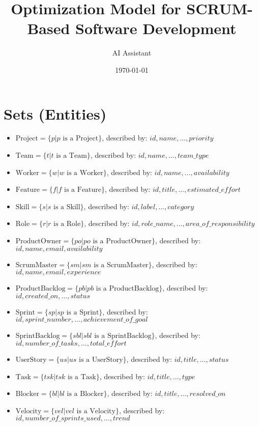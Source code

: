 \documentclass[11pt]{article}
\title{Optimization Model for SCRUM-Based Software Development}
\author{AI Assistant}
\date{\today}
\begin{document}
\maketitle
\tableofcontents
\newpage

\section{Sets (Entities)}
\begin{itemize}
    \item $\text{Project} = \{p | p \text{ is a Project}\}$, described by: $id, name, \dots, priority$
    \item $\text{Team} = \{t | t \text{ is a Team}\}$, described by: $id, name, \dots, team\_type$
    \item $\text{Worker} = \{w | w \text{ is a Worker}\}$, described by: $id, name, \dots, availability$
    \item $\text{Feature} = \{f | f \text{ is a Feature}\}$, described by: $id, title, \dots, estimated\_effort$
    \item $\text{Skill} = \{s | s \text{ is a Skill}\}$, described by: $id, label, \dots, category$
    \item $\text{Role} = \{r | r \text{ is a Role}\}$, described by: $id, role\_name, \dots, area\_of\_responsibility$
    \item $\text{ProductOwner} = \{po | po \text{ is a ProductOwner}\}$, described by: $id, name, email, availability$
    \item $\text{ScrumMaster} = \{sm | sm \text{ is a ScrumMaster}\}$, described by: $id, name, email, experience$
    \item $\text{ProductBacklog} = \{pb | pb \text{ is a ProductBacklog}\}$, described by: $id, created\_on, \dots, status$
    \item $\text{Sprint} = \{sp | sp \text{ is a Sprint}\}$, described by: $id, sprint\_number, \dots, achievement\_of\_goal$
    \item $\text{SprintBacklog} = \{sbl | sbl \text{ is a SprintBacklog}\}$, described by: $id, number\_of\_tasks, \dots, total\_effort$
    \item $\text{UserStory} = \{us | us \text{ is a UserStory}\}$, described by: $id, title, \dots, status$
    \item $\text{Task} = \{tsk | tsk \text{ is a Task}\}$, described by: $id, title, \dots, type$
    \item $\text{Blocker} = \{bl | bl \text{ is a Blocker}\}$, described by: $id, title, \dots, resolved\_on$
    \item $\text{Velocity} = \{vel | vel \text{ is a Velocity}\}$, described by: $id, number\_of\_sprints\_used, \dots, trend$
\end{itemize}
\end{document}
